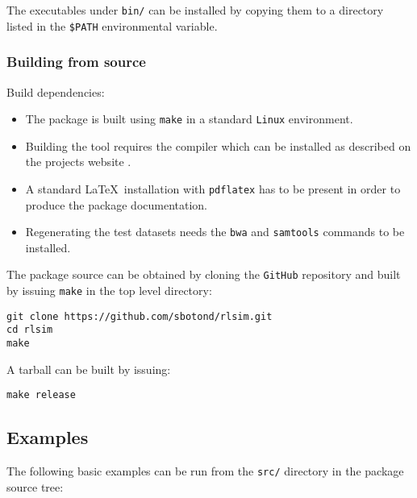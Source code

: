The executables under \texttt{bin/} can be installed by copying them to a directory listed in the \texttt{\$PATH} environmental variable.


\subsubsection{Building from source}
\label{sss:build}

Build dependencies:

\begin{itemize}
\item The package is built using \texttt{make} in a standard \texttt{Linux} environment. 
\item Building the \rlsim tool requires the \go compiler which can be installed as described on the projects website \cite{goinstall}. 
\item A standard \LaTeX\ installation with \texttt{pdflatex} has to be present in order to produce the package documentation. 
\item Regenerating the test datasets needs the {\tt bwa} \cite{bwa} and {\tt samtools} \cite{samtools} commands to be installed.
\end{itemize}

The package source can be obtained by cloning the \texttt{GitHub} repository \cite{rlsim_repo} and built by issuing \texttt{make} in the top level directory:

\begin{verbatim}
git clone https://github.com/sbotond/rlsim.git
cd rlsim
make
\end{verbatim}

A tarball can be built by issuing:

\begin{verbatim}
make release
\end{verbatim}

\subsection{Examples}
\label{ss:examples}

The following basic examples can be run from the \texttt{src/} directory in the package source tree:

